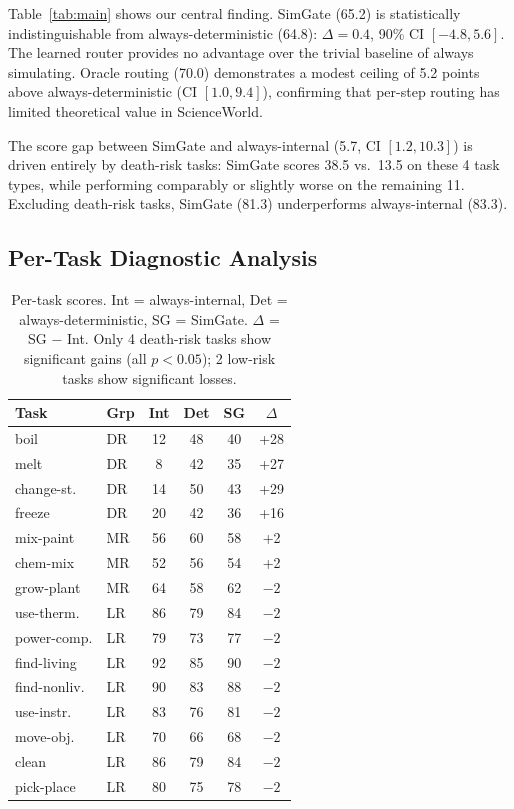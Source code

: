 \documentclass[11pt,a4paper]{article}
\begin{document}
Table~\ref{tab:main} shows our central finding. SimGate (65.2) is statistically indistinguishable from always-deterministic (64.8): $\Delta{=}0.4$, 90\% CI $[-4.8, 5.6]$. The learned router provides no advantage over the trivial baseline of always simulating. Oracle routing (70.0) demonstrates a modest ceiling of 5.2 points above always-deterministic (CI $[1.0, 9.4]$), confirming that per-step routing has limited theoretical value in ScienceWorld.

The score gap between SimGate and always-internal (5.7, CI $[1.2, 10.3]$) is driven entirely by death-risk tasks: SimGate scores 38.5 vs.\ 13.5 on these 4 task types, while performing comparably or slightly worse on the remaining 11. Excluding death-risk tasks, SimGate (81.3) underperforms always-internal (83.3).

\subsection{Per-Task Diagnostic Analysis}

\begin{table}[t]
\centering
\small
\begin{tabular}{llcccc}
\toprule
\textbf{Task} & \textbf{Grp} & \textbf{Int} & \textbf{Det} & \textbf{SG} & \textbf{$\Delta$} \\
\midrule
boil & DR & 12 & 48 & 40 & +28 \\
melt & DR & 8 & 42 & 35 & +27 \\
change-st. & DR & 14 & 50 & 43 & +29 \\
freeze & DR & 20 & 42 & 36 & +16 \\
\midrule
mix-paint & MR & 56 & 60 & 58 & +2 \\
chem-mix & MR & 52 & 56 & 54 & +2 \\
grow-plant & MR & 64 & 58 & 62 & $-2$ \\
\midrule
use-therm. & LR & 86 & 79 & 84 & $-2$ \\
power-comp. & LR & 79 & 73 & 77 & $-2$ \\
find-living & LR & 92 & 85 & 90 & $-2$ \\
find-nonliv. & LR & 90 & 83 & 88 & $-2$ \\
use-instr. & LR & 83 & 76 & 81 & $-2$ \\
move-obj. & LR & 70 & 66 & 68 & $-2$ \\
clean & LR & 86 & 79 & 84 & $-2$ \\
pick-place & LR & 80 & 75 & 78 & $-2$ \\
\bottomrule
\end{tabular}
\caption{Per-task scores. Int = always-internal, Det = always-deterministic, SG = SimGate. $\Delta$ = SG $-$ Int. Only 4 death-risk tasks show significant gains (all $p < 0.05$); 2 low-risk tasks show significant losses.}
\label{tab:pertask}
\end{table}
\end{document}
